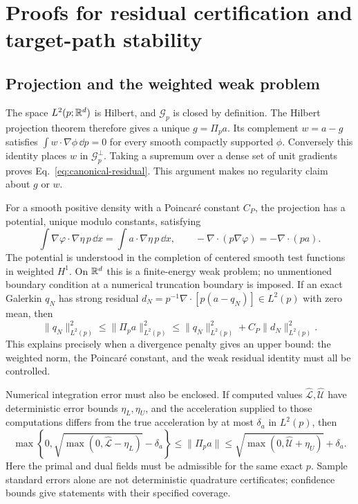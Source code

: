 \section{Proofs for residual certification and target-path stability}
\label{app:certification-proofs}

\subsection{Projection and the weighted weak problem}

The space $L^2(p;\mathbb R^d)$ is Hilbert, and $\mathcal G_p$ is closed by
definition.  The Hilbert projection theorem therefore gives a unique
$g=\Pi_pa$.  Its complement $w=a-g$ satisfies
$\int w\cdot\nabla\phi\,\dd p=0$ for every smooth compactly supported
$\phi$.  Conversely this identity places $w$ in $\mathcal G_p^\perp$.
Taking a supremum over a dense set of unit gradients proves
Eq.~\eqref{eq:canonical-residual}.  This argument makes no regularity
claim about $g$ or $w$.

For a smooth positive density with a Poincar\'e constant $C_P$, the
projection has a potential, unique modulo constants, satisfying
\begin{equation}
 \int\nabla\varphi\cdot\nabla\eta\,p\,\dd x
   =\int a\cdot\nabla\eta\,p\,\dd x,
 \qquad -\nabla\cdot(p\nabla\varphi)=-\nabla\cdot(pa).
 \label{eq:weighted-poisson-certificate}
\end{equation}
The potential is understood in the completion of centered smooth test
functions in weighted $H^1$.  On $\mathbb R^d$ this is a finite-energy weak problem;
no unmentioned boundary condition at a numerical truncation boundary is
imposed.  If an exact Galerkin $q_N$ has strong residual
$d_N=p^{-1}\nabla\cdot[p(a-q_N)]\in L^2(p)$ with zero mean, then
\begin{equation}
 \|q_N\|_{L^2(p)}^2\le\|\Pi_pa\|_{L^2(p)}^2
 \le\|q_N\|_{L^2(p)}^2+C_P\|d_N\|_{L^2(p)}^2.
 \label{eq:poisson-residual-upper}
\end{equation}
This explains precisely when a divergence penalty gives an upper bound:
the weighted norm, the Poincar\'e constant, and the weak residual identity
must all be controlled.

Numerical integration error must also be enclosed.  If computed values
$\widehat{\mathcal L},\widehat{\mathcal U}$ have deterministic error bounds
$\eta_L,\eta_U$, and the acceleration supplied to those computations differs
from the true acceleration by at most $\delta_a$ in $L^2(p)$, then
\begin{equation}
 \max\!\left\{0,\sqrt{\max(0,\widehat{\mathcal L}-\eta_L)}-\delta_a\right\}
 \le\|\Pi_pa\|
 \le\sqrt{\max(0,\widehat{\mathcal U}+\eta_U)}+\delta_a.
 \label{eq:inexact-certificate}
\end{equation}
Here the primal and dual fields must be admissible for the same exact
$p$.  Sample standard errors alone are not deterministic quadrature
certificates; confidence bounds give statements with their specified
coverage.

